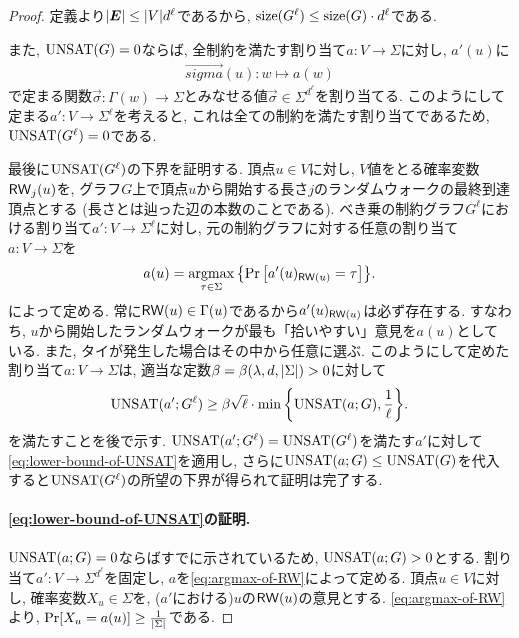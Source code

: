 \begin{proof}

定義より$\abs{\boldsymbol{E}} \le \abs{V}d^{\ell}$であるから, $\mathrm{size}(G^\ell) \le \mathrm{size}(G)\cdot d^\ell$である.

また, $\mathrm{UNSAT}(G)=0$ならば, 全制約を満たす割り当て$a\colon V \to \Sigma$に対し, $a'(u)$に
\begin{align*}
  \vec{sigma}(u)\colon w \mapsto a(w)
\end{align*}
で定まる関数$\vec{\sigma}\colon \Gamma(w)\to\Sigma$とみなせる値$\vec{\sigma}\in\Sigma^{d^\ell}$を割り当てる.
このようにして定まる$a'\colon V\to\Sigma^{\ell}$を考えると, これは全ての制約を満たす割り当てであるため, $\mathrm{UNSAT}(G^\ell)=0$である.

最後に$\mathrm{UNSAT}(G^\ell)$の下界を証明する.
頂点$u\in V$に対し, $V$値をとる確率変数$\mathsf{RW}_j(u)$を, グラフ$G$上で頂点$u$から開始する長さ$j$のランダムウォークの最終到達頂点とする (長さとは辿った辺の本数のことである).
べき乗の制約グラフ$G^\ell$における割り当て$a'\colon V \to \Sigma^{\ell}$に対し, 元の制約グラフに対する任意の割り当て$a\colon V\to\Sigma$を
\begin{align}
  a(u) = \mathop{\mathrm{argmax}}_{\tau \in \Sigma} \qty{ \Pr\qty[ a'(u)_{\mathsf{RW}(u)} = \tau ] }. \label{eq:argmax-of-RW}
\end{align}
によって定める.
常に$\mathsf{RW}(u)\in \Gamma(u)$であるから$a'(u)_{\mathsf{RW}(u)}$は必ず存在する.
すなわち, $u$から開始したランダムウォークが最も「拾いやすい」意見を$a(u)$としている.
また, タイが発生した場合はその中から任意に選ぶ.
このようにして定めた割り当て$a\colon V \to \Sigma$は, 適当な定数$\beta=\beta(\lambda,d,\abs{\Sigma})>0$に対して
\begin{align}
  \mathrm{UNSAT}(a';G^\ell) \ge \beta\sqrt{\ell}\cdot \min\qty{ \mathrm{UNSAT}(a;G), \frac{1}{\ell} }. \label{eq:lower-bound-of-UNSAT}
\end{align}
を満たすことを後で示す. $\mathrm{UNSAT}(a';G^\ell)=\mathrm{UNSAT}(G^\ell)$を満たす$a'$に対して\cref{eq:lower-bound-of-UNSAT}を適用し, さらに$\mathrm{UNSAT}(a;G)\le \mathrm{UNSAT}(G)$を代入すると$\mathrm{UNSAT}(G^\ell)$の所望の下界が得られて証明は完了する.

\paragraph*{\cref{eq:lower-bound-of-UNSAT}の証明.}

$\mathrm{UNSAT}(a;G)=0$ならばすでに示されているため, $\mathrm{UNSAT}(a;G)>0$とする.
割り当て$a'\colon V\to \Sigma^{d^{\ell}}$を固定し, $a$を\cref{eq:argmax-of-RW}によって定める.
頂点$u\in V$に対し, 確率変数$X_u\in\Sigma$を, ($a'$における)$u$の$\mathsf{RW}(u)$の意見とする.
\cref{eq:argmax-of-RW}より, $\Pr[X_u = a(u)] \ge \frac{1}{\abs{\Sigma}}$である.


\end{proof}
